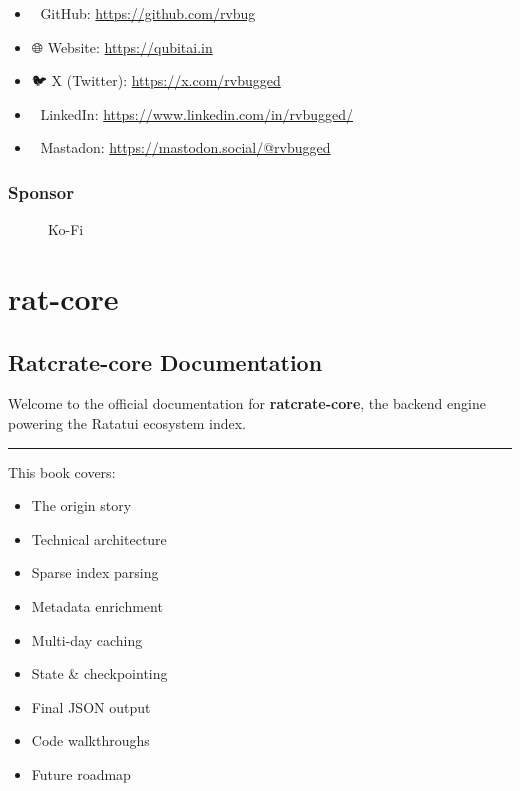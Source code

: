 \documentclass[
  letterpaper,
  DIV=11,
  numbers=noendperiod]{scrreprt}
\makeatletter
\newcommand*\pandocbounded[1]{%
  \sbox\pandoc@box{#1}%
  \Gscale@div\@tempa{\textheight}{\dimexpr\ht\pandoc@box+\dp\pandoc@box\relax}%
  \Gscale@div\@tempb{\linewidth}{\wd\pandoc@box}%
  \ifdim\@tempb\p@<\@tempa\p@\let\@tempa\@tempb\fi%
  \ifdim\@tempa\p@<\p@\scalebox{\@tempa}{\usebox\pandoc@box}%
  \else\usebox{\pandoc@box}%
  \fi%
}
\makeatother
\begin{document}
\begin{itemize}
\item
  🐙 GitHub: \url{https://github.com/rvbug}\\
\item
  🌐 Website: \url{https://qubitai.in}\\
\item
  🐦 X (Twitter): \url{https://x.com/rvbugged}\\
\item
  💼 LinkedIn: \url{https://www.linkedin.com/in/rvbugged/}\\
\item
  🐙 Mastadon: \url{https://mastodon.social/@rvbugged}\\
\end{itemize}

\section{Sponsor}\label{sponsor}

\begin{figure}[H]

{\centering \pandocbounded{}

}

\caption{Ko-Fi}

\end{figure}%

\part{rat-core}

\chapter{Ratcrate-core Documentation}\label{ratcrate-core-documentation}

Welcome to the official documentation for \textbf{ratcrate-core}, the
backend engine powering the Ratatui ecosystem index.

\begin{center}\rule{0.5\linewidth}{0.5pt}\end{center}

This book covers:

\begin{itemize}
\item
  The origin story
\item
  Technical architecture
\item
  Sparse index parsing
\item
  Metadata enrichment
\item
  Multi-day caching
\item
  State \& checkpointing
\item
  Final JSON output
\item
  Code walkthroughs
\item
  Future roadmap
\end{itemize}
\end{document}
